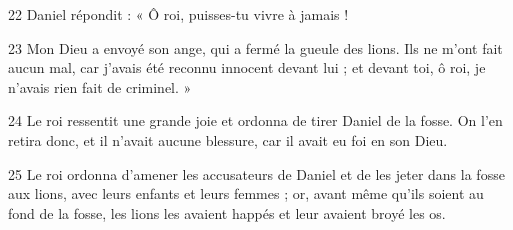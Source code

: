 
22 Daniel répondit : « Ô roi, puisses-tu vivre à jamais !

23 Mon Dieu a envoyé son ange, qui a fermé la gueule des lions. Ils ne m’ont fait aucun mal, car j’avais été reconnu innocent devant lui ; et devant toi, ô roi, je n’avais rien fait de criminel. »

24 Le roi ressentit une grande joie et ordonna de tirer Daniel de la fosse. On l’en retira donc, et il n’avait aucune blessure, car il avait eu foi en son Dieu.

25 Le roi ordonna d’amener les accusateurs de Daniel et de les jeter dans la fosse aux lions, avec leurs enfants et leurs femmes ; or, avant même qu’ils soient au fond de la fosse, les lions les avaient happés et leur avaient broyé les os.